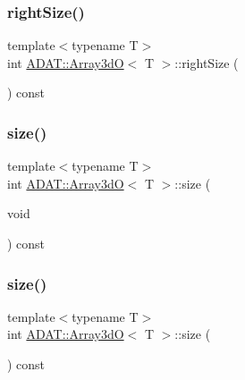 \mbox{\label{classADAT_1_1Array3dO_a81a9bfa7afe224267642e822ebe09457}} 
\subsubsection{\texorpdfstring{rightSize()}{rightSize()}\hspace{0.1cm}{\footnotesize\ttfamily [2/2]}}
{\footnotesize\ttfamily template$<$typename T$>$ \\
int \mbox{\hyperlink{classADAT_1_1Array3dO}{A\+D\+A\+T\+::\+Array3dO}}$<$ T $>$\+::right\+Size (\begin{DoxyParamCaption}{ }\end{DoxyParamCaption}) const\hspace{0.3cm}{\ttfamily [inline]}}

\mbox{\label{classADAT_1_1Array3dO_a44da6abc6d1597d9df0b983691b952fc}} 
\subsubsection{\texorpdfstring{size()}{size()}\hspace{0.1cm}{\footnotesize\ttfamily [1/2]}}
{\footnotesize\ttfamily template$<$typename T$>$ \\
int \mbox{\hyperlink{classADAT_1_1Array3dO}{A\+D\+A\+T\+::\+Array3dO}}$<$ T $>$\+::size (\begin{DoxyParamCaption}\item[{void}]{ }\end{DoxyParamCaption}) const\hspace{0.3cm}{\ttfamily [inline]}}

\mbox{\label{classADAT_1_1Array3dO_a44da6abc6d1597d9df0b983691b952fc}} 
\subsubsection{\texorpdfstring{size()}{size()}\hspace{0.1cm}{\footnotesize\ttfamily [2/2]}}
{\footnotesize\ttfamily template$<$typename T$>$ \\
int \mbox{\hyperlink{classADAT_1_1Array3dO}{A\+D\+A\+T\+::\+Array3dO}}$<$ T $>$\+::size (\begin{DoxyParamCaption}{ }\end{DoxyParamCaption}) const\hspace{0.3cm}{\ttfamily [inline]}}

